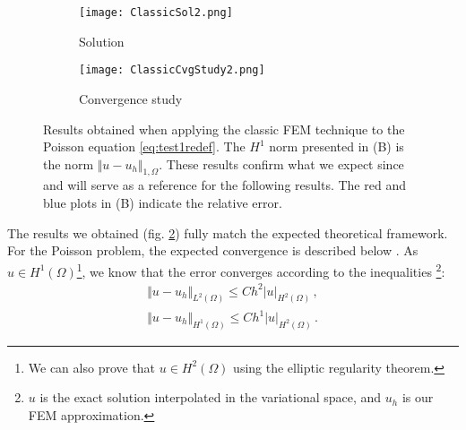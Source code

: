 

\begin{figure}[H]
    \centering
    \begin{subfigure}[b]{0.45\textwidth}
        \texttt{[image: ClassicSol2.png]}
        \caption{Solution}
        \label{fig:ClassicSol2}
    \end{subfigure}
    \begin{subfigure}[b]{0.45\textwidth}
        \texttt{[image: ClassicCvgStudy2.png]}
        \caption{Convergence study}
        \label{fig:ClassicCvgStudy2}
    \end{subfigure}
       \caption{Results obtained when applying the classic FEM technique to the Poisson equation \eqref{eq:test1redef}. The $H^1$ norm presented in (B) is the norm $\Vert u - u_h\Vert_{1, \Omega}$. These results confirm what we expect since and will serve as a reference for the following results. The red and blue plots in (B) indicate the relative error.}
       \label{fig:ClassicPoisson2}
\end{figure}
The results we obtained (fig. \ref{fig:ClassicCvgStudy2}) fully match the expected theoretical framework. For the Poisson problem, the expected convergence is described below \parencite[p.121]{ern2013theory}. As $u \in H^1(\Omega)$\footnote{We can also prove that $u \in H^2(\Omega)$ using the elliptic regularity theorem.}, we know that the error converges according to the inequalities \footnote{$u$ is the exact solution interpolated in the variational space, and $u_h$ is our FEM approximation.}:
\begin{align}
    \Vert u - u_h \Vert_{L^2(\Omega)} \leq C h^2 \vert u \vert_{H^2(\Omega)} \,, \\
    \Vert u - u_h \Vert_{H^1(\Omega)} \leq C h^1 \vert u \vert_{H^2(\Omega)} \,.
\end{align} 



